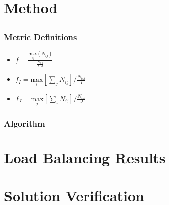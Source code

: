 \documentclass[]{beamer}
\begin{document}
\section{Method}
\subsection{}
\begin{frame}[t]\frametitle{Metric Definitions}
	\begin{block}{}
		\begin{itemize}
			\item $f =\frac{\underset{ij}{\text{max}}(N_{ij})}{\frac{N_{tot}}{I\cdot J}}$
			\item $f_I = \underset{i}{\text{max}}[\sum_{j} N_{ij}]/\frac{N_{tot}}{I}$
			\item $f_J = \underset{j}{\text{max}}[\sum_{i} N_{ij}]/\frac{N_{tot}}{J}$
		\end{itemize}
	\end{block}
\end{frame}

\begin{frame}[t]\frametitle{Algorithm}
\vspace{-0.5 cm}
\begin{block}{}

\end{block}
\end{frame}

\section{Load Balancing Results}
\subsection{}
\begin{frame}

\end{frame}

\section{Solution Verification}
\subsection{}
\begin{frame}

\end{frame}
\end{document}
